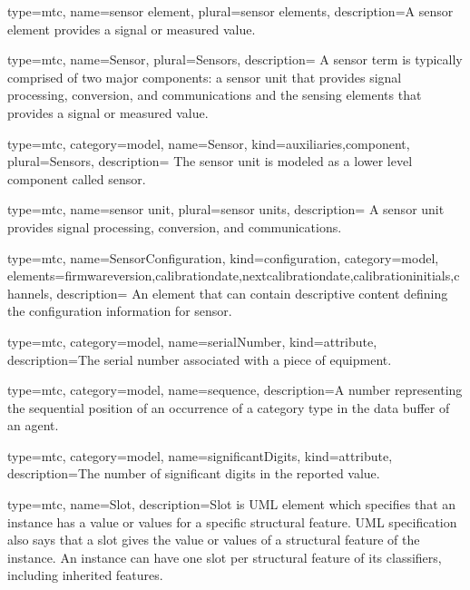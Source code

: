 {
  type=mtc,
  name={sensor element},
  plural={sensor elements},
  description={A \gls{sensor element} provides a signal or measured value.}
}


{
  type=mtc,
  name={Sensor},
  plural={Sensors},
  description= {A \gls{sensor term} is typically comprised of two major components: a \gls{sensor unit} that provides signal processing, conversion, and communications and the \glspl{sensing element} that provides a signal or measured value.}
}


{
  type=mtc,
  category=model,
  name={Sensor},
  kind={auxiliaries,component},
  plural={Sensors},
  description= {The \gls{sensor unit} is modeled as a \gls{lower level} \gls{component} called \gls{sensor}.}
}


{
  type=mtc,
  name={sensor unit},
  plural={sensor units},
  description= {A \gls{sensor unit} provides signal processing, conversion, and communications.}
}


{
  type=mtc,
  name={SensorConfiguration},
  kind={configuration},
  category=model,
  elements={\gls{firmwareversion},\gls{calibrationdate},\gls{nextcalibrationdate},\gls{calibrationinitials},\gls{channels}},
  description= {An element that can contain descriptive content defining the configuration information for \gls{sensor}.}
}


{
  type=mtc,
  category=model,
  name={serialNumber},
  kind={attribute},
  description={The serial number associated with a piece of equipment. }
}


{
  type=mtc,
  category=model,
  name={sequence},
  description={A number representing the sequential position of an occurrence of a \gls{category} type in the data buffer of an \gls{agent}. }
}


{
  type=mtc,
  category=model,
  name={significantDigits},
  kind={attribute},
  description={The number of significant digits in the reported value.}
}


{
  type=mtc,
  name=Slot,
  description={Slot is UML element which specifies that an instance has a value or values for a specific structural feature. UML specification also says that a slot gives the value or values of a structural feature of the instance. An instance can have one slot per structural feature of its classifiers, including inherited features.}
}



